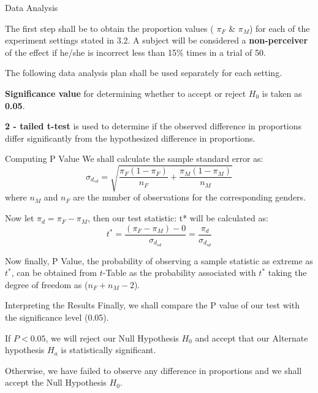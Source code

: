 \documentclass{article}
\begin{document}
\begin{psection}{Data Analysis}

	The first step shall be to obtain the proportion values ( $\pi_F$ \& $\pi_M$) for each of the experiment settings stated in 3.2. A subject will be considered a \textbf{non-perceiver} of the effect if he/she is incorrect less than 15\% times in a trial of 50.

	The following data analysis plan shall be used separately for each setting. 

	\textbf{Significance value} for determining whether to accept or reject $H_0$ is taken as \textbf{0.05}.

	\textbf{2 - tailed t-test} is used to determine if the observed difference in proportions differ significantly from the hypothesized difference in proportions.

	\begin{psubsection}{Computing P Value}
		We shall calculate the sample standard error as:
		\begin{equation}
			\sigma_{d_{sd}} = \sqrt{ \frac{\pi_F(1-\pi_F)}{n_F} + \frac{\pi_M(1-\pi_M)}{n_M}}
		\end{equation}
		where $n_M$ and $n_F$ are the number of observations for the corresponding genders.

		Now let $\pi_d = \pi_F-\pi_M$, then our test statistic: t* will be calculated as:
		\begin{equation}
			t^* = \frac{(\pi_F - \pi_M) - 0}{\sigma_{d_{sd}}} = \frac{\pi_d}{\sigma_{d_{sd}}}
		\end{equation}

		Now finally, P Value, the probability of observing a sample statistic as extreme as $t^*$, can be obtained from $t$-Table as the probability associated with $t^*$ taking the degree of freedom as ($n_F + n_M -2$).
	\end{psubsection}

	\begin{psubsection}{Interpreting the Results}
		Finally, we shall compare the P value of our test with the significance level (0.05). 

		If $P<0.05$, we will reject our Null Hypothesis $H_0$ and accept that our Alternate hypothesis $H_a$ is statistically significant.

		Otherwise, we have failed to observe any difference in proportions and we shall accept the Null Hypothesis $H_0$.
	\end{psubsection}
\end{psection}
\end{document}
